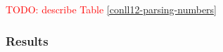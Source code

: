 \documentclass[11pt,a4paper]{article}
\newcommand{\todo}[1]{\textcolor{red}{TODO: #1}}
\begin{document}
\todo{describe Table \ref{conll12-parsing-numbers}}

\subsubsection{Results}


















\end{document}
